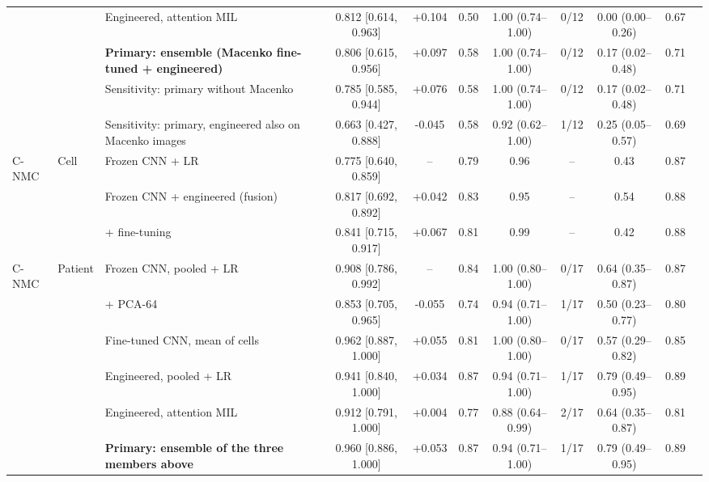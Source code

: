 \begin{table}[!t]
{\begin{tabular}{lllcccccccc}
 &  & Engineered, attention MIL & 0.812 [0.614, 0.963] & +0.104 & 0.50 & 1.00 (0.74--1.00) & 0/12 & 0.00 (0.00--0.26) & 0.67 \\
 &  & \textbf{Primary: ensemble (Macenko fine-tuned + engineered)} & 0.806 [0.615, 0.956] & +0.097 & 0.58 & 1.00 (0.74--1.00) & 0/12 & 0.17 (0.02--0.48) & 0.71 \\
 &  & Sensitivity: primary without Macenko & 0.785 [0.585, 0.944] & +0.076 & 0.58 & 1.00 (0.74--1.00) & 0/12 & 0.17 (0.02--0.48) & 0.71 \\
 &  & Sensitivity: primary, engineered also on Macenko images & 0.663 [0.427, 0.888] & -0.045 & 0.58 & 0.92 (0.62--1.00) & 1/12 & 0.25 (0.05--0.57) & 0.69 \\
\midrule
C-NMC & Cell & Frozen CNN + LR & 0.775 [0.640, 0.859] & -- & 0.79 & 0.96 & -- & 0.43 & 0.87 \\
 &  & Frozen CNN + engineered (fusion) & 0.817 [0.692, 0.892] & +0.042 & 0.83 & 0.95 & -- & 0.54 & 0.88 \\
 &  & + fine-tuning & 0.841 [0.715, 0.917] & +0.067 & 0.81 & 0.99 & -- & 0.42 & 0.88 \\
\midrule
C-NMC & Patient & Frozen CNN, pooled + LR & 0.908 [0.786, 0.992] & -- & 0.84 & 1.00 (0.80--1.00) & 0/17 & 0.64 (0.35--0.87) & 0.87 \\
 &  & + PCA-64 & 0.853 [0.705, 0.965] & -0.055 & 0.74 & 0.94 (0.71--1.00) & 1/17 & 0.50 (0.23--0.77) & 0.80 \\
 &  & Fine-tuned CNN, mean of cells & 0.962 [0.887, 1.000] & +0.055 & 0.81 & 1.00 (0.80--1.00) & 0/17 & 0.57 (0.29--0.82) & 0.85 \\
 &  & Engineered, pooled + LR & 0.941 [0.840, 1.000] & +0.034 & 0.87 & 0.94 (0.71--1.00) & 1/17 & 0.79 (0.49--0.95) & 0.89 \\
 &  & Engineered, attention MIL & 0.912 [0.791, 1.000] & +0.004 & 0.77 & 0.88 (0.64--0.99) & 2/17 & 0.64 (0.35--0.87) & 0.81 \\
 &  & \textbf{Primary: ensemble of the three members above} & 0.960 [0.886, 1.000] & +0.053 & 0.87 & 0.94 (0.71--1.00) & 1/17 & 0.79 (0.49--0.95) & 0.89 \\
\bottomrule
\end{tabular}}
\end{table}